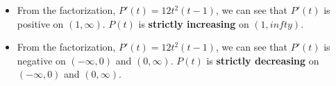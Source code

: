 \documentclass{ximera}
\begin{document}
\begin{example}
\begin{itemize}
\item From the factorization, $P'(t) = 12 t^2 (t-1)$, we can see that $P'(t)$ is positive on $(1, \infty)$. $P(t)$ is \textbf{strictly increasing} on $(1, infty)$. \\
\item From the factorization, $P'(t) = 12 t^2 (t-1)$, we can see that $P'(t)$ is negative on $(-\infty, 0)$ and $(0, \infty)$. $P(t)$ is \textbf{strictly decreasing} on $(-\infty, 0)$ and $(0, \infty)$. \\
\end{itemize}




\end{example}
\end{document}
